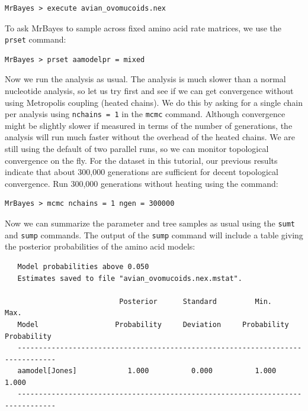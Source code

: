 \documentclass[12pt]{book}
\newcommand{\ttt}[1]{\texttt{#1} }
\begin{document}
\begin{verbatim}
MrBayes > execute avian_ovomucoids.nex
\end{verbatim}

To ask MrBayes to sample across fixed amino acid rate matrices, we use the \ttt{prset} command:

\begin{verbatim}
MrBayes > prset aamodelpr = mixed
\end{verbatim}

Now we run the analysis as usual. The analysis is much slower than a normal nucleotide analysis, so
let us try first and see if we can get convergence without using Metropolis coupling (heated chains).
We do this by asking for a single chain per analysis using \ttt{nchains = 1} in
the \ttt{mcmc} command. Although convergence might be slightly slower if measured in terms of the
number of generations, the analysis will run much faster without the overhead of the heated chains.
We are still using the default of two parallel runs, so we can monitor topological convergence on the fly.
For the dataset in this tutorial, our previous results indicate that about 300,000 generations are
sufficient for decent topological convergence. Run 300,000 generations without heating using the command:

\begin{verbatim}
MrBayes > mcmc nchains = 1 ngen = 300000
\end{verbatim}

Now we can summarize the parameter and tree samples as usual using the \ttt{sumt} and \ttt{sump}
commands. The output of the \ttt{sump} command will include a table giving the posterior probabilities
of the amino acid models:

\begin{singlespacing}
\scriptsize
\begin{verbatim}
   Model probabilities above 0.050
   Estimates saved to file "avian_ovomucoids.nex.mstat".

                           Posterior      Standard         Min.           Max.   
   Model                  Probability     Deviation     Probability    Probability
   -------------------------------------------------------------------------------
   aamodel[Jones]            1.000          0.000          1.000          1.000
   -------------------------------------------------------------------------------
\end{verbatim}
\normalsize
\end{singlespacing}
\end{document}
